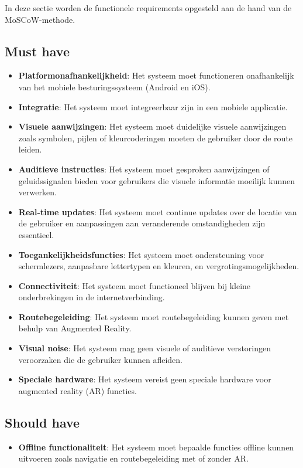 In deze sectie worden de functionele requirements opgesteld aan de hand van de MoSCoW-methode.

\subsection*{Must have}
\begin{itemize}
    \item \textbf{Platformonafhankelijkheid}: Het systeem moet functioneren onafhankelijk van het mobiele besturingssysteem (Android en iOS).
    \item \textbf{Integratie}: Het systeem moet integreerbaar zijn in een mobiele applicatie.
    \item \textbf{Visuele aanwijzingen}: Het systeem moet duidelijke visuele aanwijzingen zoals symbolen, pijlen of kleurcoderingen moeten de gebruiker door de route leiden.
    \item \textbf{Auditieve instructies}: Het systeem moet gesproken aanwijzingen of geluidssignalen bieden voor gebruikers die visuele informatie moeilijk kunnen verwerken.
    \item \textbf{Real-time updates}: Het systeem moet continue updates over de locatie van de gebruiker en aanpassingen aan veranderende omstandigheden zijn essentieel.
    \item \textbf{Toegankelijkheidsfuncties}: Het systeem moet ondersteuning voor schermlezers, aanpasbare lettertypen en kleuren, en vergrotingsmogelijkheden.
    \item \textbf{Connectiviteit}: Het systeem moet functioneel blijven bij kleine onderbrekingen in de internetverbinding.
    \item \textbf{Routebegeleiding}: Het systeem moet routebegeleiding kunnen geven met behulp van Augmented Reality.
    \item \textbf{Visual noise}: Het systeem mag geen visuele of auditieve verstoringen veroorzaken die de gebruiker kunnen afleiden.
    \item \textbf{Speciale hardware}: Het systeem vereist geen speciale hardware voor augmented reality (AR) functies.
\end{itemize}

\subsection*{Should have}
\begin{itemize}
    \item \textbf{Offline functionaliteit}: Het systeem moet bepaalde functies offline kunnen uitvoeren zoals navigatie en routebegeleiding met of zonder AR.
\end{itemize}

